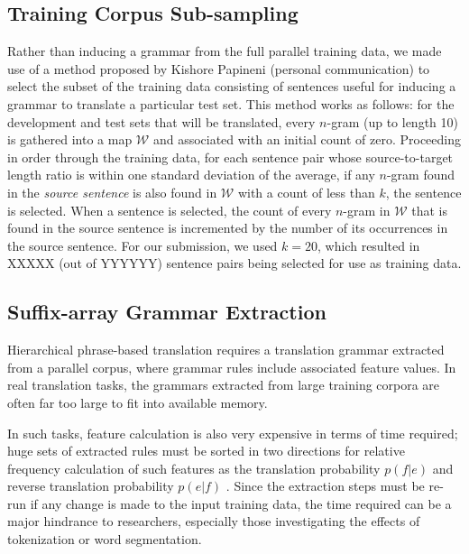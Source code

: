 \documentclass[11pt]{article}
\newcommand{\ignore}[1]{}
\begin{document}
\subsection{Training Corpus Sub-sampling}

Rather than inducing a grammar from the full parallel training data, we made use of a method proposed by Kishore Papineni (personal communication) to select the subset of the training data consisting of  sentences useful for inducing a grammar to translate a particular test set.  This method works as follows: for the development and test sets that will be translated, every $n$-gram (up to length 10) is gathered into a map $\mathcal{W}$ and associated with an initial count of zero.  Proceeding in order through the training data, for each sentence pair whose source-to-target length ratio is within one standard deviation of the average, if any $n$-gram found in the \emph{source sentence} is also found in $\mathcal{W}$ with a count of less than $k$, the sentence is selected.  When a sentence is selected, the count of every $n$-gram in $\mathcal{W}$ that is found in the source sentence is incremented by the number of its occurrences in the source sentence. \ignore{Thus, there are two conditions in which a sentence will not be selected: 1) it only contains $n$-grams that are not found in $\mathcal{W}$ (making it useless for learning in the highly lexicalized models we use) or 2) it only contains $n$-grams that have already been attested in the selected set $k$ or more times.} For our submission, we used $k=20$, which resulted in XXXXX (out of YYYYYY) sentence pairs being selected for use as training data.

\subsection{Suffix-array Grammar Extraction}

Hierarchical phrase-based translation requires a translation grammar extracted from a parallel corpus, where grammar rules include associated feature values. In real translation tasks, the grammars extracted from large training corpora are often far too large to fit into available memory.

In such tasks, feature calculation is also very expensive in terms of time required; huge sets of extracted rules must be sorted in two directions for relative frequency calculation of such features as the translation probability $p(f|e)$ and reverse translation probability $p(e|f)$ \cite{Koehn2003}. Since the extraction steps must be re-run if any change is made to the input training data, the time required can be a major hindrance to researchers, especially those investigating the effects of tokenization or word segmentation.
\end{document}
